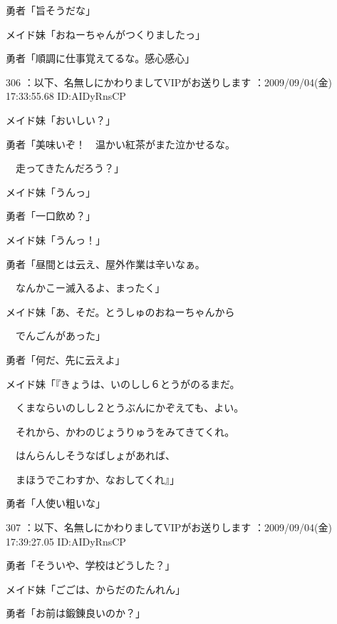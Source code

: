 \documentclass[a4j,twocolumn]{tarticle}
\begin{document}
勇者「旨そうだな」\par{} 
メイド妹「おねーちゃんがつくりましたっ」 



勇者「順調に仕事覚えてるな。感心感心」 

	
    
    

306 ：以下、名無しにかわりましてVIPがお送りします ：2009/09/04(金) 17:33:55.68 ID:AIDyRnsCP 


メイド妹「おいしい？」 



勇者「美味いぞ！　温かい紅茶がまた泣かせるな。\par{} 
　走ってきたんだろう？」 



メイド妹「うんっ」 



勇者「一口飲め？」\par{} 
メイド妹「うんっ！」 



勇者「昼間とは云え、屋外作業は辛いなぁ。\par{} 
　なんかこー滅入るよ、まったく」 



メイド妹「あ、そだ。とうしゅのおねーちゃんから\par{} 
　でんごんがあった」 



勇者「何だ、先に云えよ」 



メイド妹「『きょうは、いのしし６とうがのるまだ。\par{} 
　くまならいのしし２とうぶんにかぞえても、よい。\par{} 
　それから、かわのじょうりゅうをみてきてくれ。\par{} 
　はんらんしそうなばしょがあれば、\par{} 
　まほうでこわすか、なおしてくれ』」 



勇者「人使い粗いな」 

	
    
    

307 ：以下、名無しにかわりましてVIPがお送りします ：2009/09/04(金) 17:39:27.05 ID:AIDyRnsCP 


勇者「そういや、学校はどうした？」\par{} 
メイド妹「ごごは、からだのたんれん」 



勇者「お前は鍛錬良いのか？」 
\end{document}
